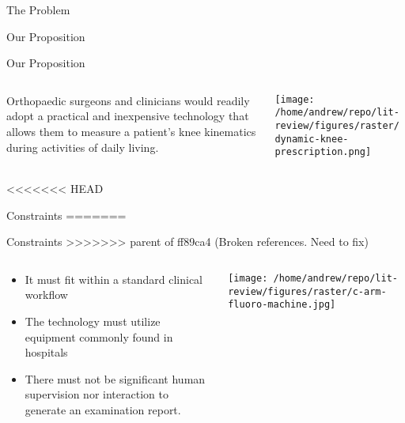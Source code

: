 \documentclass[presentation, aspectratio=1610]{beamer}
\begin{document}
\begin{frame}[label={sec:org51bdd62}]{The Problem}
\begin{frame}[label={sec:org827823c}]{Our Proposition}
\begin{frame}[label={sec:org1b6f1a3}]{Our Proposition}
\begin{columns}
\begin{column}{0.5\columnwidth}
Orthopaedic surgeons and clinicians would readily adopt a practical and inexpensive technology that allows them to measure a patient's knee kinematics during activities of daily living.
\end{column}
\begin{column}{0.55\columnwidth}
\begin{center}
\texttt{[image: /home/andrew/repo/lit-review/figures/raster/dynamic-knee-prescription.png]}
\end{center}
\end{column}
\end{columns}
\end{frame}
<<<<<<< HEAD
\begin{frame}[label={sec:org8655799}]{Constraints}
=======
\begin{frame}[label={sec:org25f1ab3}]{Constraints}
>>>>>>> parent of ff89ca4 (Broken references. Need to fix)
\begin{columns}
\begin{column}{0.45\columnwidth}
\begin{itemize}
\item It must fit within a standard clinical workflow
\item The technology must utilize equipment commonly found in hospitals
\item There must not be significant human supervision nor interaction to generate an examination report.
\end{itemize}
\end{column}
\begin{column}{0.55\columnwidth}
\begin{center}
\texttt{[image: /home/andrew/repo/lit-review/figures/raster/c-arm-fluoro-machine.jpg]}
\end{center}
\end{column}
\end{columns}
\end{frame}

\end{frame}
\end{frame}
\end{frame}
\end{document}
